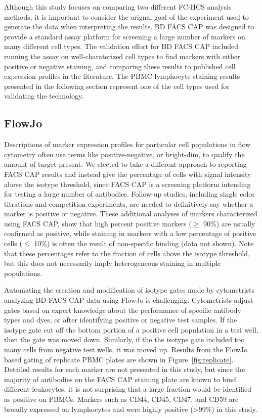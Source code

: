 \documentclass[12pt]{article}
\begin{document}
Although this study focuses on comparing two different FC-HCS analysis methods,
it is important to consider the orignal goal of the experiment used to generate
the data when interpreting the results. BD FACS CAP was designed to provide a
standard assay platform for screening a large number of markers on many
different cell types. The validation effort for BD FACS CAP included running
the assay on well-charaterized cell types to find markers with either positive
or negative staining, and comparing these results to published cell expression
profiles in the literature. The PBMC lymphocyte staining results presented in
the following section represent one of the cell types used for validating the
technology.


\subsection*{FlowJo}

Descriptions of marker expression profiles for particular cell populations in
flow cytometry often use terms like positive-negative, or bright-dim, to
qualify the amount of target present. We elected to take a different approach
to reporting FACS CAP results and instead give the percentage of cells with
signal intensity above the isotype threshold, since FACS CAP is a screening
platform intending for testing a large number of antibodies. Follow-up studies,
including single color titrations and competition experiments, are needed to
definitively say whether a marker is positive or negative. These additional
analyses of markers characterized using FACS CAP, show that high percent
positive markers ($\ge$ 90\%) are usually confirmed as positive, while staining
in markers with a low percentage of positive cells ($\le$ 10\%) is often the
result of non-specific binding (data not shown). Note that these percentages
refer to the fraction of cells above the isotype threshold, but this does not
necessarily imply heterogeneous staining in multiple populations.

Automating the creation and modification of isotype gates made by cytometrists
analyzing BD FACS CAP data using FlowJo is challenging. Cytometrists adjust
gates based on expert knowledge about the performance of specific antibody
types and dyes, or after identifying positive or negative test samples. If the
isotype gate cut off the bottom portion of a positive cell population in a test
well, then the gate was moved down.  Similarly, if the the isotype gate
included too many cells from negative test wells, it was moved up. Results from
the FlowJo based gating of replicate PBMC plates are shown in
Figure~\ref{fig:replicate}. Detailed results for each marker are not
presented in this study, but since the majority of antibodies on the FACS
CAP staining plate are known to bind different leukocytes, it is not surprising
that a large fraction would be identified as positive on PBMCs. Markers such as
CD44, CD45, CD47, and CD59 are broadly expressed on lymphocytes and were highly
positive (>99\%) in this study.
\end{document}
